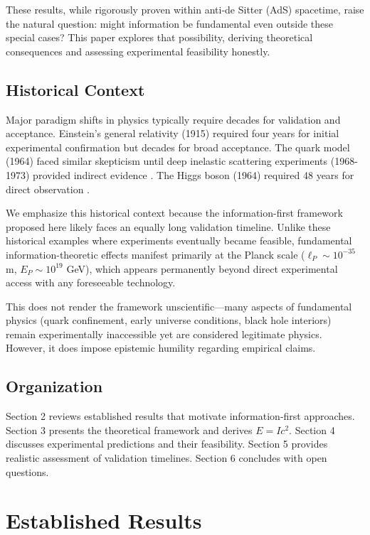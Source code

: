 \documentclass[12pt,twocolumn]{article}
\theoremstyle{definition}
\theoremstyle{remark}
\begin{document}
These results, while rigorously proven within anti-de Sitter (AdS) spacetime, raise the natural question: might information be fundamental even outside these special cases? This paper explores that possibility, deriving theoretical consequences and assessing experimental feasibility honestly.

\subsection{Historical Context}

Major paradigm shifts in physics typically require decades for validation and acceptance. Einstein's general relativity (1915) required four years for initial experimental confirmation \cite{Dyson1919} but decades for broad acceptance. The quark model (1964) faced similar skepticism until deep inelastic scattering experiments (1968-1973) provided indirect evidence \cite{Bloom1969}. The Higgs boson (1964) required 48 years for direct observation \cite{ATLAS2012}.

We emphasize this historical context because the information-first framework proposed here likely faces an equally long validation timeline. Unlike these historical examples where experiments eventually became feasible, fundamental information-theoretic effects manifest primarily at the Planck scale ($\ell_P \sim 10^{-35}$ m, $E_P \sim 10^{19}$ GeV), which appears permanently beyond direct experimental access with any foreseeable technology.

This does not render the framework unscientific—many aspects of fundamental physics (quark confinement, early universe conditions, black hole interiors) remain experimentally inaccessible yet are considered legitimate physics. However, it does impose epistemic humility regarding empirical claims.

\subsection{Organization}

Section 2 reviews established results that motivate information-first approaches. Section 3 presents the theoretical framework and derives $E = Ic^2$. Section 4 discusses experimental predictions and their feasibility. Section 5 provides realistic assessment of validation timelines. Section 6 concludes with open questions.

\section{Established Results}
\end{document}

